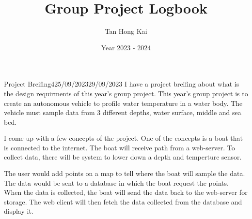 \documentclass[12pt]{article}
\title{Group Project Logbook}
\author{Tan Hong Kai}
\date{Year 2023 - 2024}
\begin{document}
\maketitle

\begin{logbook-entry}{Project Breifing}{4}{25/09/2023}{29/09/2023}
I have a project breifing about what is the design requirments of this year's group project.
This year's group project is to create an autonomous vehicle to profile water temperature in a water body.
The vehicle must sample data from 3 different depths, water surface, middle and sea bed.

I come up with a few concepts of the project.
One of the concepts is a boat that is connected to the internet.
The boat will receive path from a web-server.
To collect data, there will be system to lower down a depth and temperture sensor.

The user would add points on a map to tell where the boat will sample the data.
The data would be sent to a database in which the boat request the points.
When the data is collected, the boat will send the data back to the web-server for storage.
The web client will then fetch the data collected from the database and display it.
\end{logbook-entry}
\end{document}

